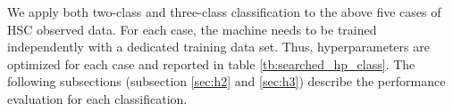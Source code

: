 \documentclass[useamsfonts]{pasj01}
\begin{document}
\begin{table}[htbp]
\label{tab:HSCsurvey_schedule}
\end{table}
%
%
We apply both two-class and three-class classification to the above five cases of HSC observed data.
For each case, the machine needs to be trained independently with a dedicated training data set.
Thus, hyperparameters are optimized for each case and reported in table \ref{tb:searched_hp_class}.
The following subsections (subsection \ref{sec:h2} and \ref{sec:h3}) describe the performance evaluation for each classification.
%
%
\end{document}
